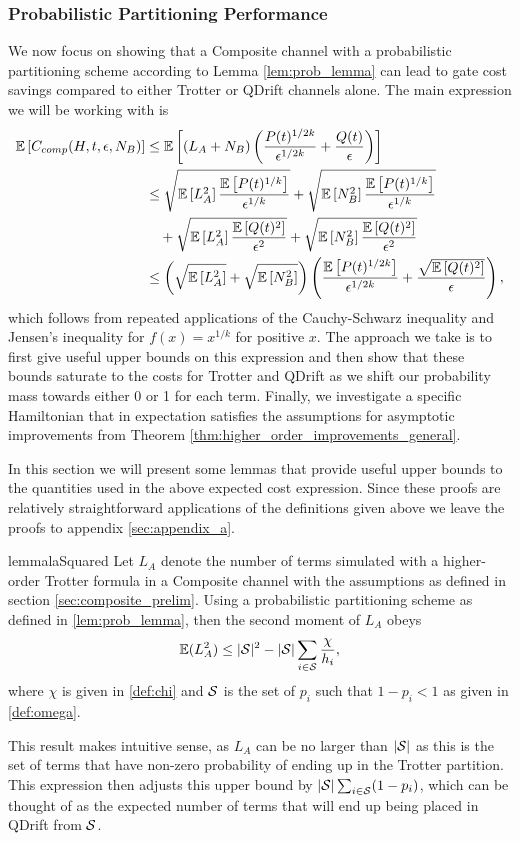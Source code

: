 \subsubsection{Probabilistic Partitioning Performance} \label{sec:prob_limits}
We now focus on showing that a Composite channel with a probabilistic partitioning scheme according to Lemma \ref{lem:prob_lemma} can lead to gate cost savings compared to either Trotter or QDrift channels alone. The main expression we will be working with is
\begin{align}
    \mathbb{E}\left[ C_{comp}(H, t, \epsilon, N_B) \right] &\leq \mathbb{E}\left[ (L_A + N_B)\left( \frac{P(t)^{1/2k}}{\epsilon^{1/2k}} + \frac{Q(t)}{\epsilon} \right) \right] \\
    &\leq \sqrt{\mathbb{E}\left[ L_A^2 \right] \frac{\mathbb{E}\left[ P(t)^{1/k} \right]}{\epsilon^{1/k}}} + \sqrt{\mathbb{E}\left[ N_B^2 \right] \frac{\mathbb{E}\left[ P(t)^{1/k} \right] }{\epsilon^{1/k}} } \nonumber \\
    &\quad + \sqrt{\mathbb{E}\left[ L_A^2 \right] \frac{\mathbb{E}\left[ Q(t)^2 \right]}{\epsilon^2}} + \sqrt{\mathbb{E}\left[ N_B^2 \right] \frac{\mathbb{E}\left[ Q(t)^2 \right]}{\epsilon^2}} \\
    &\leq \left( \sqrt{\mathbb{E}\left[ L_A^2 \right]} + \sqrt{\mathbb{E}\left[ N_B^2 \right]} \right) \left( \frac{\mathbb{E}\left[ P(t)^{1/2k} \right]}{\epsilon^{1/2k}} + \frac{\sqrt{\mathbb{E}\left[ Q(t)^2 \right]}}{\epsilon} \right), \label{eq:expected_cost_basic}
\end{align}
which follows from repeated applications of the Cauchy-Schwarz inequality and Jensen's inequality for $f(x) = x^{1/k}$ for positive $x$. The approach we take is to first give useful upper bounds on this expression and then show that these bounds saturate to the costs for Trotter and QDrift as we 
shift our probability mass towards either 0 or 1 for each term. Finally, we investigate a specific Hamiltonian that in expectation satisfies the
assumptions for asymptotic improvements from Theorem \ref{thm:higher_order_improvements_general}. 

In this section we will present some lemmas that provide useful upper bounds to the quantities used in the above expected cost expression. Since these proofs are relatively straightforward applications of the definitions given above we leave the proofs to appendix \ref{sec:appendix_a}. 

\begin{restatable}{lemma}{laSquared} \label{lem:la_squared}
Let $L_A$ denote the number of terms simulated with a higher-order Trotter formula in a Composite channel with the assumptions as defined in section \ref{sec:composite_prelim}. Using a probabilistic partitioning scheme as defined in \ref{lem:prob_lemma}, then the second moment of $L_A$ obeys
$$\mathbb{E}(L_A^2) \le |\mathcal{S}|^2 - |\mathcal{S}| \sum_{i \in \mathcal{S}} \frac{\chi}{h_i},$$
where $\chi$ is given in \ref{def:chi} and $\mathcal{S}$ is the set of $p_i$ such that $1-p_i < 1$ as given in \ref{def:omega}.
\end{restatable}
This result makes intuitive sense, as $L_A$ can be no larger than $|\mathcal{S}|$ as this is the set of terms that have non-zero probability of ending up in the Trotter partition. This expression then adjusts this upper bound by $|\mathcal{S}| \sum_{i \in \mathcal{S}} (1-p_i)$, which can be thought of as the expected number of terms that will end up being placed in QDrift from $\mathcal{S}$. 

